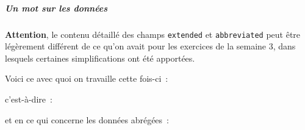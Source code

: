     \hypertarget{un-mot-sur-les-donnuxe9es}{%
\subparagraph{Un mot sur les données}\label{un-mot-sur-les-donnuxe9es}}

    \textbf{Attention}, le contenu détaillé des champs \texttt{extended} et
\texttt{abbreviated} peut être légèrement différent de ce qu'on avait
pour les exercices de la semaine 3, dans lesquels certaines
simplifications ont été apportées.

Voici ce avec quoi on travaille cette fois-ci~:

\begin{Shaded}
\begin{Highlighting}[frame=lines,framerule=0.6mm,rulecolor=\color{asisframecolor}]
\OperatorTok{>>>}\NormalTok{ extended[}\NormalTok{]}
\NormalTok{[}\NormalTok{, }\NormalTok{, }\NormalTok{, }\NormalTok{, }\NormalTok{, }\NormalTok{, }\NormalTok{, }\NormalTok{, }\NormalTok{, }\NormalTok{, }\NormalTok{, }\NormalTok{, }\NormalTok{, }\NormalTok{, }\NormalTok{, }\NormalTok{, }\NormalTok{, }\NormalTok{, }\NormalTok{, }\NormalTok{, }\NormalTok{, }\NormalTok{]}
\end{Highlighting}
\end{Shaded}

c'est-à-dire~:

\begin{Shaded}
\begin{Highlighting}[frame=lines,framerule=0.6mm,rulecolor=\color{asisframecolor}]
\NormalTok{[ }\NormalTok{, latitude, longitude, _, _, timestamp, name, _, _, _, country, ...]}
\end{Highlighting}
\end{Shaded}

et en ce qui concerne les données abrégées~:

\begin{Shaded}
\begin{Highlighting}[frame=lines,framerule=0.6mm,rulecolor=\color{asisframecolor}]
\OperatorTok{>>>}\NormalTok{ abbreviated[}\NormalTok{]}
\NormalTok{[}\NormalTok{, }\NormalTok{, }\NormalTok{, }\NormalTok{, }\NormalTok{, }\NormalTok{, }\NormalTok{]}
\end{Highlighting}
\end{Shaded}

